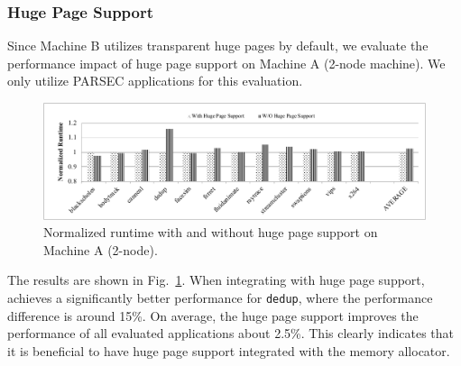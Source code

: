 





\subsubsection{Huge Page Support} 
\label{sec:hugepage}

Since Machine B utilizes transparent huge pages by default, we evaluate the performance impact of huge page support on Machine A (2-node machine). We only utilize PARSEC applications for this evaluation. 

\begin{figure}[!h]
    \centering
    \includegraphics[width=\textwidth]{figure/hugepage.pdf}
    \caption{Normalized runtime with and without huge page support on Machine A (2-node).}
    \label{fig:hugepage}
\end{figure}

The results are shown in Fig.~\ref{fig:hugepage}. When integrating with huge page support, \NM{} achieves a significantly better performance for \texttt{dedup}, where the performance difference is around 15\%. On average, the huge page support improves the performance of all evaluated applications about 2.5\%. This clearly indicates that it is beneficial to have huge page support integrated with the memory allocator.  


